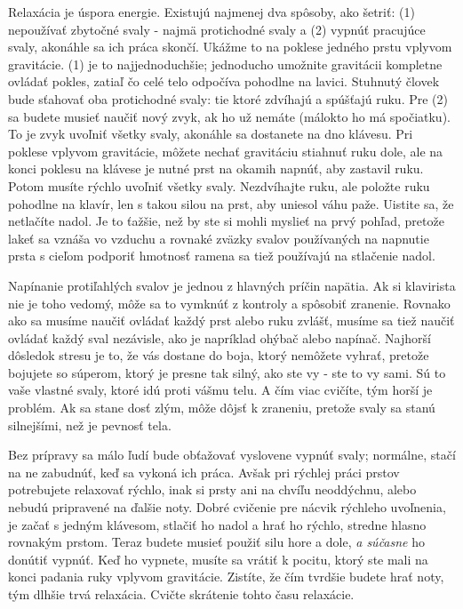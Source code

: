 Relaxácia je úspora energie. Existujú najmenej dva spôsoby, ako šetriť: (1) nepoužívať zbytočné svaly - najmä protichodné svaly a (2) vypnúť pracujúce svaly, akonáhle sa ich práca skončí. Ukážme to na poklese jedného prstu vplyvom gravitácie. (1) je to najjednoduchšie; jednoducho umožnite gravitácii kompletne ovládať pokles, zatiaľ čo celé telo odpočíva pohodlne na lavici. Stuhnutý človek bude sťahovať oba protichodné svaly: tie ktoré zdvíhajú a spúšťajú ruku. Pre (2) sa budete musieť naučiť nový zvyk, ak ho už nemáte (málokto ho má spočiatku). To je zvyk uvoľniť všetky svaly, akonáhle sa dostanete na dno klávesu. Pri  poklese vplyvom gravitácie, môžete nechať gravitáciu stiahnuť ruku dole, ale na konci poklesu na klávese je nutné prst na okamih napnúť, aby zastavil ruku. Potom musíte rýchlo uvoľniť všetky svaly. Nezdvíhajte ruku, ale položte ruku pohodlne na klavír, len s takou silou na prst, aby uniesol váhu paže. Uistite sa, že netlačíte nadol. Je to ťažšie, než by ste si mohli myslieť na prvý pohľad, pretože lakeť sa vznáša vo vzduchu a rovnaké zväzky svalov používaných na napnutie prsta s cieľom podporiť hmotnosť ramena sa tiež používajú na stlačenie nadol.

Napínanie protiľahlých svalov je jednou z hlavných príčin napätia. Ak si klavirista nie je toho vedomý, môže sa to vymknúť z kontroly a spôsobiť zranenie. Rovnako ako sa musíme naučiť ovládať každý prst alebo ruku zvlášť, musíme sa tiež naučiť ovládať každý sval nezávisle, ako je napríklad ohýbač alebo napínač. Najhorší dôsledok stresu je to, že vás dostane do boja, ktorý nemôžete vyhrať, pretože bojujete so súperom, ktorý je presne tak silný, ako ste vy - ste to vy sami. Sú to vaše vlastné svaly, ktoré idú proti vášmu telu. A čím viac cvičíte, tým horší je problém. Ak sa stane dosť zlým, môže dôjsť k zraneniu, pretože svaly sa stanú silnejšími, než je pevnosť tela.

Bez prípravy sa málo ľudí bude obťažovať vyslovene vypnúť svaly; normálne, stačí na ne zabudnúť, keď sa vykoná ich práca. Avšak pri rýchlej práci prstov potrebujete relaxovať rýchlo, inak si prsty ani na chvíľu neoddýchnu, alebo nebudú pripravené na ďalšie noty. Dobré cvičenie pre nácvik rýchleho uvoľnenia, je začať s jedným klávesom, stlačiť ho nadol a hrať ho rýchlo, stredne hlasno rovnakým prstom. Teraz budete musieť použiť silu hore a dole, \textit{a súčasne} ho donútiť vypnúť. Keď ho vypnete, musíte sa vrátiť k pocitu, ktorý ste mali na konci padania ruky vplyvom gravitácie. Zistíte, že čím tvrdšie budete hrať noty, tým dlhšie trvá relaxácia. Cvičte skrátenie tohto času relaxácie.

